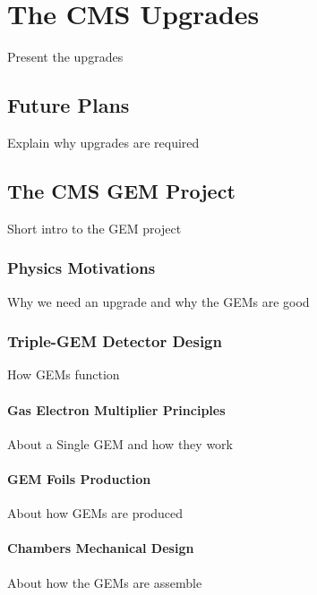 \chapter{The CMS Upgrades}
\label{chap:upgrades}

    Present the upgrades

    \section{Future Plans}

        Explain why upgrades are required

    \section{The CMS GEM Project}

        Short intro to the GEM project

        \subsection{Physics Motivations}

            Why we need an upgrade and why the GEMs are good

        \subsection{Triple-GEM Detector Design}

            How GEMs function

            \subsubsection{Gas Electron Multiplier Principles}

                About a Single GEM and how they work

            \subsubsection{GEM Foils Production}

                About how GEMs are produced

            \subsubsection{Chambers Mechanical Design}

                About how the GEMs are assemble

